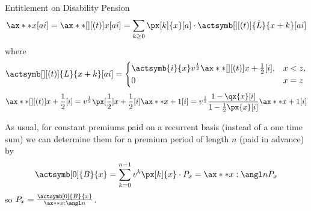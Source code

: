 \documentclass[11pt,a4paper,twoside]{article}
\begin{document}
Entitlement on Disability Pension
\[ \ax**{x}[ai] =  \ax**[][(t)]{x}[ai] = \sum_{k \geq 0} \px[k]{x}[a] \cdot \actsymb[][(t)]{\hat{L}}{x+k}[ai] \]
where 
\[
  \actsymb[][(t)]{L}{x+k}[ai] = \begin{cases}
    \actsymb{i}{x} v^{\frac{1}{2}} \ax**[][(t)]{x + \frac{1}{2}}[i], & x < z, \\
    0 & x = z
  \end{cases}
\]
\[
  \ax**[][(t)]{x + \frac{1}{2}}[i] = v^{\frac{1}{2}} \px[\frac{1}{2}]{x + \frac{1}{2}}[i] \ax**{x+1}[i] 
  = v^{\frac{1}{2}} \frac{1 - \qx{x}[i]}{1 - \frac{1}{2} \px{x}[i]} \ax**{x+1}[i] 
\]

As usual, for constant premiums paid on a recurrent basis (instead of a one time sum) we can determine them 
for a premium period of length \( n \) (paid in advance) by
\[ \actsymb[0]{B}{x} = \sum_{k=0}^{n-1} v^k \px[k]{x} \cdot P_x = \ax**{x:\angl n} P_x \]
so \( P_x = \frac{\actsymb[0]{B}{x}}{\ax**{x:\angl n}} \).
\end{document}
